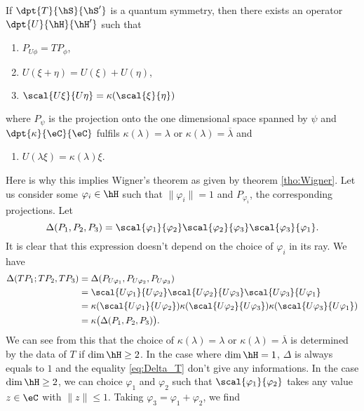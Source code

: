 \begin{theorem}
If $\dpt{T}{\hS}{\hS'}$ is a quantum symmetry, then there exists an operator $\dpt{U}{\hH}{\hH'}$ such that
\begin{enumerate}
\item $P_{U\phi}=TP_{\phi}$,
\item $U(\xi+\eta)=U(\xi)+U(\eta)$,
\item $\scal{U\xi}{U\eta}=\kappa(\scal{\xi}{\eta})$ \label{item:cond_3}
\end{enumerate}
where $P_{\psi}$ is the projection onto the one dimensional space spanned by $\psi$ and $\dpt{\kappa}{\eC}{\eC}$ fulfils $\kappa(\lambda)=\lambda$ or $\kappa(\lambda)=\overline{\lambda}$ and 

\begin{enumerate}
\item $U(\lambda\xi)=\kappa(\lambda)\xi$.
\end{enumerate}
\label{tho:pre_Wigner}
\end{theorem}
Here is why this implies Wigner's theorem as given by theorem \ref{tho:Wigner}. Let us consider some $\varphi_i\in\hH$ such that $\|\varphi_i\|=1$ and $P_{\varphi_i}$, the corresponding projections. Let
\[
   \Delta(P_1,P_2,P_3)=\scal{\varphi_1}{\varphi_2}\scal{\varphi_2}{\varphi_3}\scal{\varphi_3}{\varphi_1}.
\]
It is clear that this expression doesn't depend on the choice of $\varphi_i$ in its ray. We have
\begin{equation}\label{eq:Delta_T}
\begin{split}
\Delta(TP_1;TP_2,TP_3)&=\Delta(P_{U\varphi_1},P_{U\varphi_2},P_{U\varphi_3})\\
                      &=\scal{U\varphi_1}{U\varphi_2}\scal{U\varphi_2}{U\varphi_3}\scal{U\varphi_3}{U\varphi_1}\\
		      &=\kappa(\scal{U\varphi_1}{U\varphi_2})\kappa(\scal{U\varphi_2}{U\varphi_3})\kappa(\scal{U\varphi_3}{U\varphi_1})\\
		      &=\kappa\big(\Delta(P_1,P_2,P_3)\big).
\end{split}
\end{equation}
We can see from this that the choice of $\kappa(\lambda)=\lambda$ or $\kappa(\lambda)=\overline{\lambda}$ is determined by the data of $T$ if $\dim\hH\geq 2$. In the case where $\dim\hH=1$, $\Delta$ is always equals to $1$ and the equality \eqref{eq:Delta_T} don't give any informations. In the case $\dim\hH\geq 2$, we can choice $\varphi_1$ and $\varphi_2$ such that $\scal{\varphi_1}{\varphi_2}$ takes any value $z\in\eC$ with $\|z\|\leq 1$. Taking $\varphi_3=\varphi_1+\varphi_2$, we find
